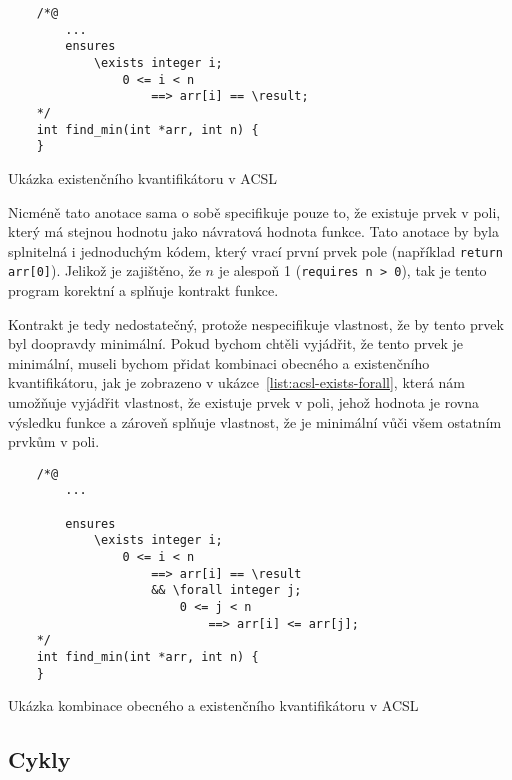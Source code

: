 \begin{listing}[H]
    \begin{verbatim}
    /*@
        ...
        ensures
            \exists integer i;
                0 <= i < n
                    ==> arr[i] == \result;
    */
    int find_min(int *arr, int n) {
    }
    \end{verbatim}
    \caption{Ukázka existenčního kvantifikátoru v ACSL}
    \label{list:acsl-exists}
\end{listing}

Nicméně tato anotace sama o sobě specifikuje pouze to, že existuje prvek v poli,
který má stejnou hodnotu jako návratová hodnota funkce.
Tato anotace by byla splnitelná i jednoduchým kódem, který vrací první prvek pole (například \texttt{return arr[0]}).
Jelikož je zajištěno, že $n$ je alespoň 1 (\texttt{requires n > 0}),
tak je tento program korektní a splňuje kontrakt funkce.



Kontrakt je tedy nedostatečný, protože nespecifikuje vlastnost,
že by tento prvek byl doopravdy minimální.
Pokud bychom chtěli vyjádřit, že tento prvek je minimální,
museli bychom přidat kombinaci obecného a existenčního kvantifikátoru,
jak je zobrazeno v ukázce~\ref{list:acsl-exists-forall},
která nám umožňuje vyjádřit vlastnost, že existuje prvek v poli,
jehož hodnota je rovna výsledku funkce a zároveň splňuje vlastnost,
že je minimální vůči všem ostatním prvkům v poli.

\begin{listing}[H]
    \begin{verbatim}
    /*@
        ...

        ensures
            \exists integer i;
                0 <= i < n
                    ==> arr[i] == \result
                    && \forall integer j;
                        0 <= j < n
                            ==> arr[i] <= arr[j];
    */
    int find_min(int *arr, int n) {
    }
    \end{verbatim}
    \caption{Ukázka kombinace obecného a existenčního kvantifikátoru v ACSL}
    \label{list:acsl-exists-forall}
\end{listing}


\subsection{Cykly}
\label{subsec:acsl-cykly}

